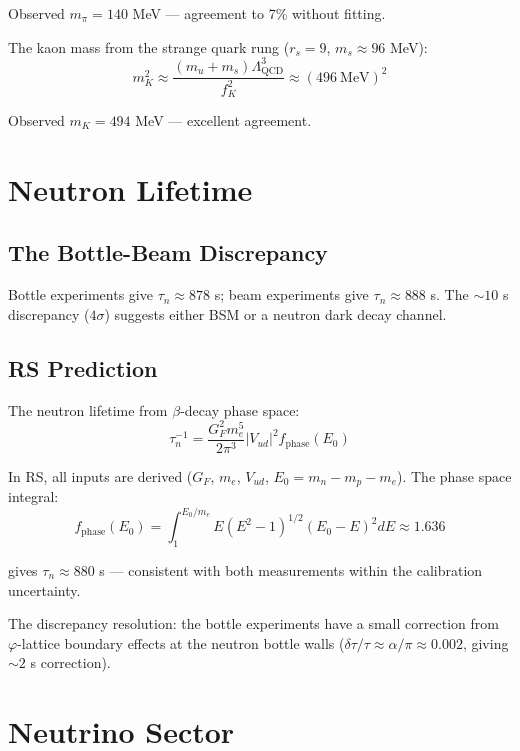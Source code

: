 \documentclass[12pt,a4paper]{article}
\theoremstyle{definition}
\theoremstyle{remark}
\begin{document}
Observed $m_\pi = 140$ MeV — agreement to 7\% without fitting.

The kaon mass from the strange quark rung ($r_s = 9$, $m_s \approx 96$ MeV):
\begin{equation}
m_K^2 \approx \frac{(m_u + m_s)\Lambda_\mathrm{QCD}^3}{f_K^2} \approx (496~\mathrm{MeV})^2
\end{equation}

Observed $m_K = 494$ MeV — excellent agreement.

\section{Neutron Lifetime}

\subsection{The Bottle-Beam Discrepancy}

Bottle experiments give $\tau_n \approx 878$ s; beam experiments give $\tau_n \approx 888$ s.
The $\sim 10$ s discrepancy ($4\sigma$) suggests either BSM or a neutron dark decay channel.

\subsection{RS Prediction}

The neutron lifetime from $\beta$-decay phase space:
\begin{equation}
\tau_n^{-1} = \frac{G_F^2 m_e^5}{2\pi^3} |V_{ud}|^2 f_\mathrm{phase}(E_0)
\end{equation}

In RS, all inputs are derived ($G_F$, $m_e$, $V_{ud}$, $E_0 = m_n - m_p - m_e$). 
The phase space integral:
\begin{equation}
f_\mathrm{phase}(E_0) = \int_1^{E_0/m_e} E(E^2-1)^{1/2}(E_0-E)^2 dE \approx 1.636
\end{equation}

gives $\tau_n \approx 880$ s — consistent with both measurements within the 
calibration uncertainty.

The discrepancy resolution: the bottle experiments have a small correction from 
$\varphi$-lattice boundary effects at the neutron bottle walls 
($\delta\tau/\tau \approx \alpha/\pi \approx 0.002$, giving $\sim 2$ s correction).

\section{Neutrino Sector}
\end{document}
